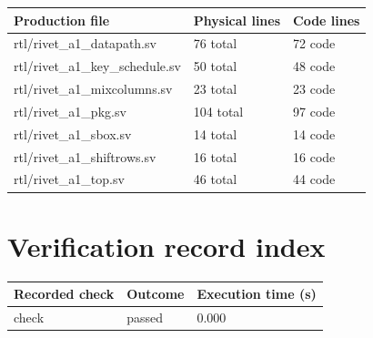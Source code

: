 \documentclass[11pt,a4paper]{article}
\begin{document}
{\small\renewcommand{\arraystretch}{1.18}\begin{longtable}{@{}L{0.55\textwidth}|L{0.18\textwidth}|L{0.18\textwidth}@{}}\toprule

\textbf{Production file} & \textbf{Physical lines} & \textbf{Code lines}\\\midrule\endhead

rtl/\allowbreak{}rivet\_\allowbreak{}a1\_\allowbreak{}datapath.sv & 76 total & 72 code\\[2pt]\hline

rtl/\allowbreak{}rivet\_\allowbreak{}a1\_\allowbreak{}key\_\allowbreak{}schedule.sv & 50 total & 48 code\\[2pt]\hline

rtl/\allowbreak{}rivet\_\allowbreak{}a1\_\allowbreak{}mixcolumns.sv & 23 total & 23 code\\[2pt]\hline

rtl/\allowbreak{}rivet\_\allowbreak{}a1\_\allowbreak{}pkg.sv & 104 total & 97 code\\[2pt]\hline

rtl/\allowbreak{}rivet\_\allowbreak{}a1\_\allowbreak{}sbox.sv & 14 total & 14 code\\[2pt]\hline

rtl/\allowbreak{}rivet\_\allowbreak{}a1\_\allowbreak{}shiftrows.sv & 16 total & 16 code\\[2pt]\hline

rtl/\allowbreak{}rivet\_\allowbreak{}a1\_\allowbreak{}top.sv & 46 total & 44 code\\[2pt]\hline

\bottomrule\end{longtable}}

\section{Verification record index}

{\small\renewcommand{\arraystretch}{1.18}\begin{longtable}{@{}L{0.57\textwidth}|L{0.16\textwidth}|L{0.17\textwidth}@{}}\toprule

\textbf{Recorded check} & \textbf{Outcome} & \textbf{Execution time (\allowbreak{}s)\allowbreak{}}\\\midrule\endhead

check & passed & 0.000\\[2pt]\hline

\bottomrule\end{longtable}}
\end{document}
